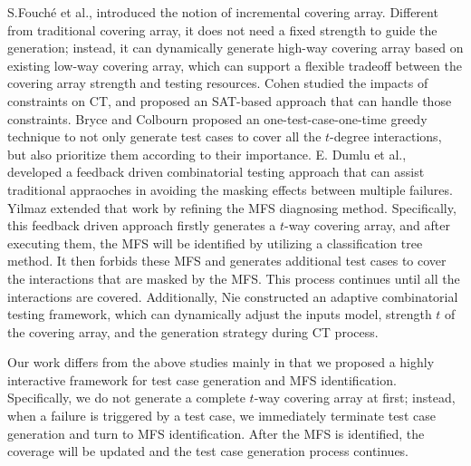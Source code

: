 \documentclass[10pt,journal,compsoc]{IEEEtran}
\begin{document}
S.Fouch{\'e}  et al., \cite{fouche2009incremental} introduced the notion of incremental covering array. Different from traditional covering array, it does not need a fixed strength to guide the generation; instead, it can dynamically generate high-way covering array based on existing low-way covering array, which can support a flexible tradeoff between the covering array strength and testing resources. Cohen \cite{cohen2007exploiting,cohen2008constructing} studied the impacts of constraints on CT, and proposed an SAT-based approach that can handle those constraints.  Bryce and Colbourn \cite{bryce2006prioritized} proposed an one-test-case-one-time greedy technique to not only generate test cases to cover all the $t$-degree interactions, but also prioritize them according to their importance.  E. Dumlu et al., \cite{dumlu2011feedback} developed a feedback driven
combinatorial testing approach that can assist traditional appraoches in avoiding the masking effects between multiple failures. Yilmaz \cite{yilmaz2013reducing} extended that work by refining the MFS diagnosing method. Specifically, this feedback driven approach firstly generates a $t$-way covering array, and after executing them, the MFS will be identified by utilizing a classification tree method. It then forbids these MFS and generates additional test cases to cover the interactions that are masked by the MFS. This process continues until all the interactions are covered. Additionally, Nie \cite{nie2013adaptive} constructed an adaptive combinatorial testing framework, which can dynamically adjust the inputs model, strength $t$ of the covering array, and the generation strategy during CT process.

Our work differs from the above studies mainly in that we proposed a highly interactive framework for test case generation and MFS identification. Specifically, we do not generate a complete $t$-way covering array at first; instead, when a failure is triggered by a test case, we immediately terminate test case generation and turn to MFS identification. After the MFS is identified, the coverage will be updated and the test case generation process continues.
\end{document}
